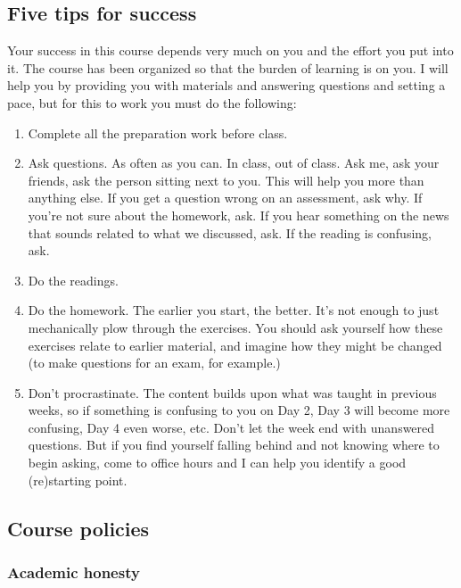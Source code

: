 \documentclass[
  letterpaper,
  DIV=11,
  numbers=noendperiod]{scrartcl}
\begin{document}
\subsection{Five tips for success}\label{five-tips-for-success}

Your success in this course depends very much on you and the effort you
put into it. The course has been organized so that the burden of
learning is on you. I will help you by providing you with materials and
answering questions and setting a pace, but for this to work you must do
the following:

\begin{enumerate}
\def\labelenumi{\arabic{enumi}.}
\item
  Complete all the preparation work before class.
\item
  Ask questions. As often as you can. In class, out of class. Ask me,
  ask your friends, ask the person sitting next to you. This will help
  you more than anything else. If you get a question wrong on an
  assessment, ask why. If you're not sure about the homework, ask. If
  you hear something on the news that sounds related to what we
  discussed, ask. If the reading is confusing, ask.
\item
  Do the readings.
\item
  Do the homework. The earlier you start, the better. It's not enough to
  just mechanically plow through the exercises. You should ask yourself
  how these exercises relate to earlier material, and imagine how they
  might be changed (to make questions for an exam, for example.)
\item
  Don't procrastinate. The content builds upon what was taught in
  previous weeks, so if something is confusing to you on Day 2, Day 3
  will become more confusing, Day 4 even worse, etc. Don't let the week
  end with unanswered questions. But if you find yourself falling behind
  and not knowing where to begin asking, come to office hours and I can
  help you identify a good (re)starting point.
\end{enumerate}

\subsection{Course policies}\label{course-policies}

\subsubsection{Academic honesty}\label{academic-honesty}
\end{document}
